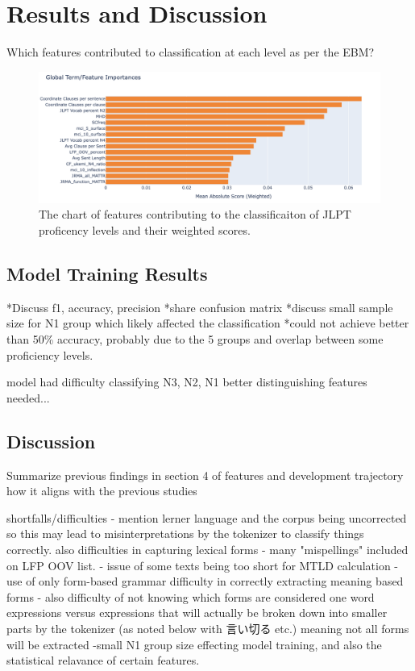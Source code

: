 \chapter{Results and Discussion}
Which features contributed to classification at each level as per the EBM?

\begin{figure}[h!]
    \centering
    \includegraphics[scale=.4]{img/feature_importance}
    \caption{The chart of features contributing to the classificaiton of JLPT proficency levels and their weighted scores. }
    \label{fig:featureimportance}
\end{figure}

\section{Model Training Results}
*Discuss f1, accuracy, precision
*share confusion matrix
*discuss small sample size for N1 group which likely affected the classification
*could not achieve better than 50\% accuracy, probably due to the 5 groups and overlap between some proficiency levels.

model had difficulty classifying N3, N2, N1 better distinguishing features needed...

\section{Discussion}
Summarize previous findings in section 4 of features and development trajectory how it aligns with the previous studies





shortfalls/difficulties
- mention lerner language and the corpus being uncorrected so this may lead to misinterpretations by the tokenizer to classify things correctly.
    also difficulties in capturing lexical forms - many "mispellings" included on LFP OOV list.
- issue of some texts being too short for MTLD calculation
- use of only form-based grammar difficulty in correctly extracting meaning based forms
- also difficulty of not knowing which forms are considered one word expressions versus expressions that will
actually be broken down into smaller parts by the tokenizer (as noted below with 言い切る etc.) meaning not all forms
will be extracted
-small N1 group size effecting model training, and also the statistical relavance of certain features.

